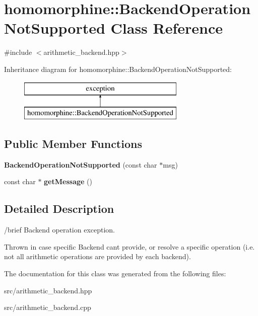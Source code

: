 \hypertarget{classhomomorphine_1_1_backend_operation_not_supported}{}\section{homomorphine\+::Backend\+Operation\+Not\+Supported Class Reference}
\label{classhomomorphine_1_1_backend_operation_not_supported}


{\ttfamily \#include $<$arithmetic\+\_\+backend.\+hpp$>$}

Inheritance diagram for homomorphine\+::Backend\+Operation\+Not\+Supported\+:\begin{figure}[H]
\begin{center}
\leavevmode
\includegraphics[height=2.000000cm]{classhomomorphine_1_1_backend_operation_not_supported}
\end{center}
\end{figure}
\subsection*{Public Member Functions}
\begin{DoxyCompactItemize}
\item 
\mbox{\label{classhomomorphine_1_1_backend_operation_not_supported_a8db72ebb31be4189807aa36fec1ee927}} 
{\bfseries Backend\+Operation\+Not\+Supported} (const char $\ast$msg)
\item 
\mbox{\label{classhomomorphine_1_1_backend_operation_not_supported_a909fc0802c577f246d5400baba44da45}} 
const char $\ast$ {\bfseries get\+Message} ()
\end{DoxyCompactItemize}


\subsection{Detailed Description}
/brief Backend operation exception.

Thrown in case specific Backend can\textquotesingle{}t provide, or resolve a specific operation (i.\+e. not all arithmetic operations are provided by each backend). 

The documentation for this class was generated from the following files\+:\begin{DoxyCompactItemize}
\item 
src/arithmetic\+\_\+backend.\+hpp\item 
src/arithmetic\+\_\+backend.\+cpp\end{DoxyCompactItemize}
